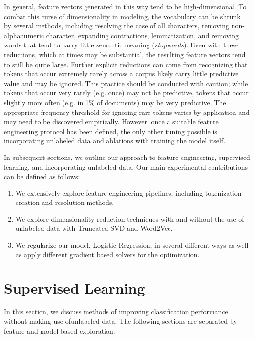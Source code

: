 \documentclass[11pt,a4paper]{article}
\begin{document}
In general, feature vectors generated in this way tend to be high-dimensional. To combat this curse of dimensionality in modeling, the vocabulary can be shrunk by several methods, including resolving the case of all characters, removing non-alphanumeric character, expanding contractions, lemmatization, and removing words that tend to carry little semantic meaning (\textit{stopwords}). Even with these reductions, which at times may be substantial, the resulting feature vectors tend to still be quite large. Further explicit reductions can come from recognizing that tokens that occur extremely rarely across a corpus likely carry little predictive value and may be ignored. This practice should be conducted with caution; while tokens that occur very rarely (e.g. once) may not be predictive, tokens that occur slightly more often (e.g. in 1\% of documents) may be very predictive. The appropriate frequency threshold for ignoring rare tokens varies by application and may need to be discovered empirically. However, once a suitable feature engineering protocol has been defined, the only other tuning possible is incorporating unlabeled data and ablations with training the model itself.

In subsequent sections, we outline our approach to feature engineering, supervised learning, and incorporating unlabeled data. Our main experimental contributions can be defined as follows:
\begin{enumerate}
  \item We extensively explore feature engineering pipelines, including tokenization creation and resolution methods.
    \item We explore dimensionality reduction techniques with and without the use of unlabeled data with Truncated SVD and Word2Vec.
      \item We regularize our model, Logistic Regression, in several different ways as well as apply different gradient based solvers for the optimization.
\end{enumerate}




\section{Supervised Learning}%
\label{sec:supervised_learning}

In this section, we discuss methods of improving classification performance without making use ofunlabeled data. The following sections are separated by feature and model-based exploration.
\end{document}
